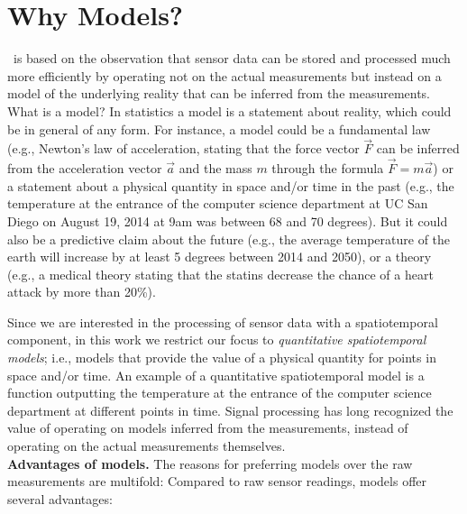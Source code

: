 \section{Why Models?}
\label{sec:model-abstract}

\projName\ is based on the observation that sensor data can be stored and processed much more efficiently by operating not on the actual measurements but instead on a model of the underlying reality that can be inferred from the measurements. What is a model? In statistics a model is a statement about reality, which could be in general of any form. For instance, a model could be a fundamental law (e.g., Newton's law of acceleration, stating that the force vector $\vec{F}$ can be inferred from the acceleration vector $\vec{a}$ and the mass $m$ through the formula $\vec{F}=m \vec{a}$) or a statement about a physical quantity in space and/or time in the past (e.g., the temperature at the entrance of the computer science department at UC San Diego on August 19, 2014 at 9am was between 68 and 70 degrees). But it could also be a predictive claim about the future (e.g., the average temperature of the earth will increase by at least 5 degrees between 2014 and 2050), or a  theory (e.g., a medical theory stating that the statins decrease the chance of a heart attack by more than 20\%).

Since we are interested in the processing of sensor data with a spatiotemporal component, in this work we restrict our focus to \emph{quantitative spatiotemporal models}; i.e., models that provide the value of a physical quantity for points in space and/or time. An example of a quantitative spatiotemporal model is a function outputting the temperature at the entrance of the computer science department at different points in time. Signal processing has long recognized the value of operating on models inferred from the measurements, instead of operating on the actual measurements themselves.\\

{\bf Advantages of models.} The reasons for preferring models over the raw measurements are multifold: Compared to raw sensor readings, models offer several advantages:

